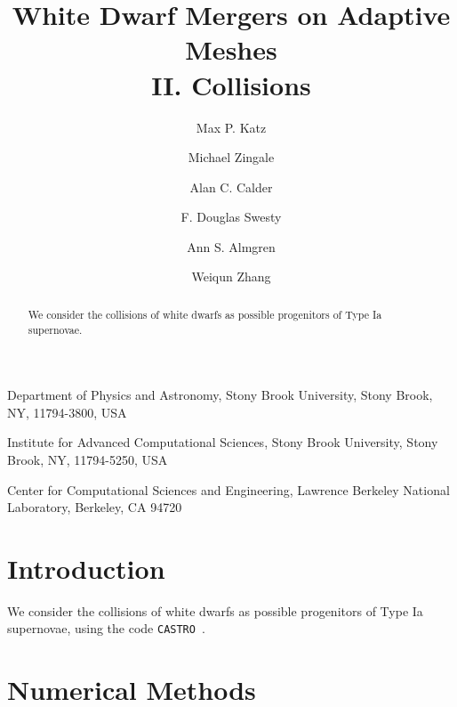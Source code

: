 \documentclass[twocolumn,numberedappendix]{../aastex6}
\newcommand{\castro}{\texttt{CASTRO}}
\begin{document}
\title{White Dwarf Mergers on Adaptive Meshes\\ II. Collisions}


\author{Max P. Katz}
\author{Michael Zingale}
\author{Alan C. Calder}
\author{F. Douglas Swesty}
\author{Ann S. Almgren}
\author{Weiqun Zhang}

{
  Department of Physics and Astronomy,
  Stony Brook University, Stony Brook, NY, 11794-3800, USA
}

{
  Institute for Advanced Computational Sciences,
  Stony Brook University, Stony Brook, NY, 11794-5250, USA
}

{
  Center for Computational Sciences and Engineering,
  Lawrence Berkeley National Laboratory, Berkeley, CA 94720
}

\begin{abstract}
We consider the collisions of white dwarfs as possible progenitors of Type Ia 
supernovae.

\end{abstract}

\section{Introduction}
\label{sec:introduction}

We consider the collisions of white dwarfs as possible progenitors of Type Ia 
supernovae, using the code \castro\ \cite{castro}.


\section{Numerical Methods}
\label{sec:numericalmethods}
\end{document}
